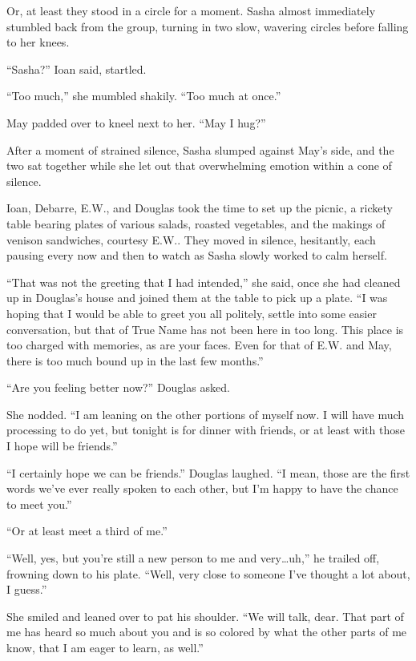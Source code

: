 Or, at least they stood in a circle for a moment. Sasha almost immediately stumbled back from the group, turning in two slow, wavering circles before falling to her knees.

``Sasha?'' Ioan said, startled.

``Too much,'' she mumbled shakily. ``Too much at once.''

May padded over to kneel next to her. ``May I hug?''

After a moment of strained silence, Sasha slumped against May's side, and the two sat together while she let out that overwhelming emotion within a cone of silence.

Ioan, Debarre, E.W., and Douglas took the time to set up the picnic, a rickety table bearing plates of various salads, roasted vegetables, and the makings of venison sandwiches, courtesy E.W.. They moved in silence, hesitantly, each pausing every now and then to watch as Sasha slowly worked to calm herself.

``That was not the greeting that I had intended,'' she said, once she had cleaned up in Douglas's house and joined them at the table to pick up a plate. ``I was hoping that I would be able to greet you all politely, settle into some easier conversation, but that of True Name has not been here in too long. This place is too charged with memories, as are your faces. Even for that of E.W. and May, there is too much bound up in the last few months.''

``Are you feeling better now?'' Douglas asked.

She nodded. ``I am leaning on the other portions of myself now. I will have much processing to do yet, but tonight is for dinner with friends, or at least with those I hope will be friends.''

``I certainly hope we can be friends.'' Douglas laughed. ``I mean, those are the first words we've ever really spoken to each other, but I'm happy to have the chance to meet you.''

``Or at least meet a third of me.''

``Well, yes, but you're still a new person to me and very\ldots uh,'' he trailed off, frowning down to his plate. ``Well, very close to someone I've thought a lot about, I guess.''

She smiled and leaned over to pat his shoulder. ``We will talk, dear. That part of me has heard so much about you and is so colored by what the other parts of me know, that I am eager to learn, as well.''

